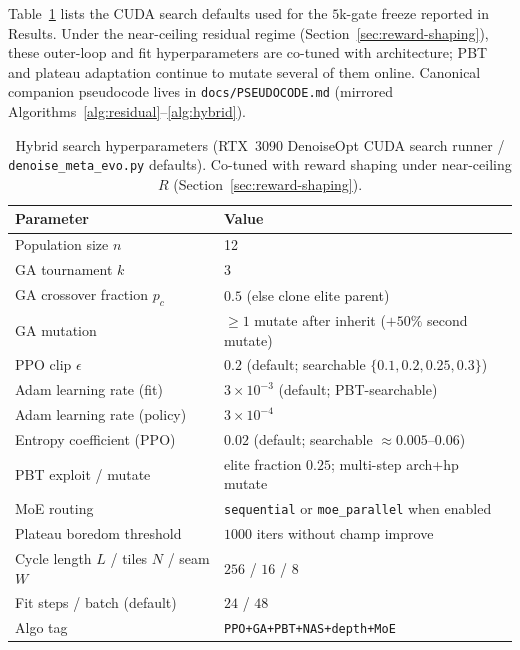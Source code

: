 Table~\ref{tab:hyperparams} lists the CUDA search defaults used for the $5$k-gate freeze reported in Results.
Under the near-ceiling residual regime (Section~\ref{sec:reward-shaping}), these outer-loop and fit hyperparameters are co-tuned with architecture; PBT and plateau adaptation continue to mutate several of them online.
Canonical companion pseudocode lives in \texttt{docs/PSEUDOCODE.md} (mirrored Algorithms~\ref{alg:residual}--\ref{alg:hybrid}).

\begin{table}[t]
  \centering
  \small
  \caption{Hybrid search hyperparameters (RTX~3090 DenoiseOpt CUDA search runner / \texttt{denoise\_meta\_evo.py} defaults). Co-tuned with reward shaping under near-ceiling $R$ (Section~\ref{sec:reward-shaping}).}
  \label{tab:hyperparams}
  \setlength{\tabcolsep}{3pt}
  \begin{tabular}{@{}lp{}@{}}
    \toprule
    Parameter & Value \\
    \midrule
    Population size $n$ & 12 \\
    GA tournament $k$ & 3 \\
    GA crossover fraction $p_c$ & $0.5$ (else clone elite parent) \\
    GA mutation & $\ge 1$ mutate after inherit ($+50\%$ second mutate) \\
    PPO clip $\epsilon$ & $0.2$ (default; searchable $\{0.1,0.2,0.25,0.3\}$) \\
    Adam learning rate (fit) & $3{\times}10^{-3}$ (default; PBT-searchable) \\
    Adam learning rate (policy) & $3{\times}10^{-4}$ \\
    Entropy coefficient (PPO) & $0.02$ (default; searchable $\approx 0.005$--$0.06$) \\
    PBT exploit / mutate & elite fraction $0.25$; multi-step arch+hp mutate \\
    MoE routing & \texttt{sequential} or \texttt{moe\_parallel} when enabled \\
    Plateau boredom threshold & $1000$ iters without champ improve \\
    Cycle length $L$ / tiles $N$ / seam $W$ & $256$ / $16$ / $8$ \\
    Fit steps / batch (default) & $24$ / $48$ \\
    Algo tag & \texttt{PPO+GA+PBT+NAS+depth+MoE} \\
    \bottomrule
  \end{tabular}
\end{table}
